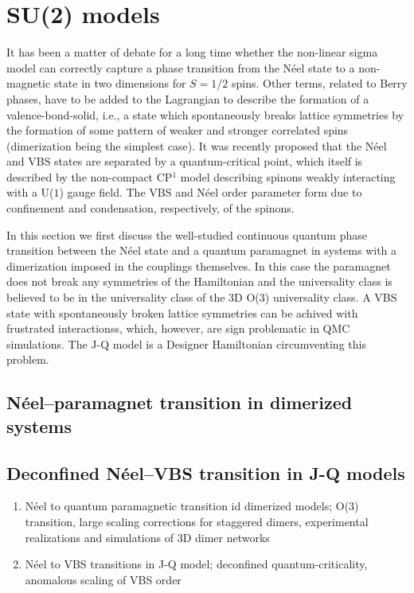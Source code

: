 \documentclass[aps,prb,groupedaddress,twocolumn]{revtex4}
\begin{document}
\section{SU(2) models}

It has been a matter of debate for a long time whether the non-linear sigma model can correctly capture a 
phase transition from the N\'eel state to a non-magnetic state in two dimensions for $S=1/2$ spins. Other terms, related to 
Berry phases, have to be added to the Lagrangian to describe the formation of a valence-bond-solid, i.e., a state which 
spontaneously breaks lattice symmetries by the formation of some pattern of weaker and stronger correlated spins (dimerization 
being the simplest case). It was recently proposed that the N\'eel and VBS states are separated by a quantum-critical point, 
which itself is described by the non-compact CP$^1$ model describing spinons weakly interacting with a U($1$) gauge field.
The VBS and N\'eel order parameter form due to confinement and condensation, respectively, of the spinons. 

In this section we first discuss the well-studied continuous quantum phase transition between the N\'eel state and a quantum
paramagnet in systems with a dimerization imposed in the couplings themselves. In this case the paramagnet does not break any
symmetries of the Hamiltonian and the universality class is believed to be in the universality class of the 3D O($3$) universality
class. A VBS state with spontaneously broken lattice symmetries can be achived with frustrated interactionss, which, however, are
sign problematic in QMC simulations. The J-Q model is a Designer Hamiltonian circumventing this problem.

\subsection{N\'eel--paramagnet transition in dimerized systems}

\subsection{Deconfined N\'eel--VBS transition in J-Q models}

\begin{enumerate}
\item N\'eel to quantum paramagnetic transition id dimerized models; O(3) transition, large scaling
corrections for staggered dimers, experimental realizations and simulations of 3D dimer networks
\item N\'eel to VBS transitions in J-Q model; deconfined quantum-criticality, anomalous scaling of VBS order
\end{enumerate}
\end{document}
